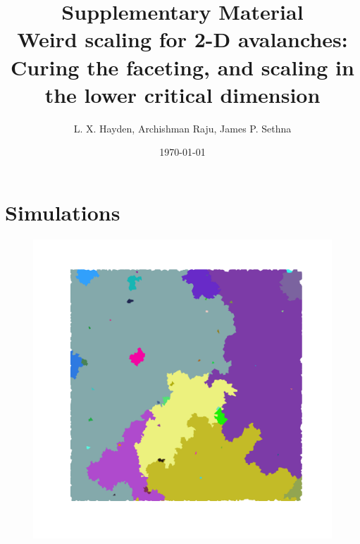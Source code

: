 \documentclass[reprint,amsmath,amssymb,aps,floatfix]{revtex4-1}
\begin{document}
%
\title{Supplementary Material \\  Weird scaling for 2-D avalanches: \\Curing the faceting, and scaling in the lower critical dimension}
%
\author{L. X. Hayden, Archishman Raju, James P. Sethna}
%
\date{\today}
\maketitle

\section{\label{app:sims} Simulations}
%
\begin{figure}[!b]
\centering
  	\includegraphics[scale=0.08]{avalanche_image_size1000000_seed150_r0pt5.png}

\end{figure}
\end{document}
